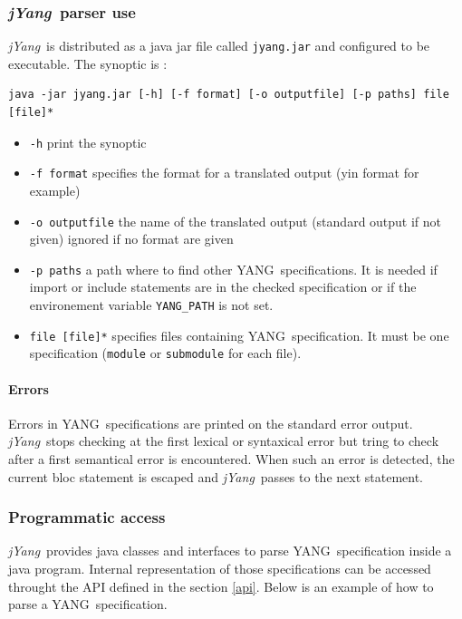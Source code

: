 \documentclass[a4paper]{article}
\newcommand{\jyang}{{\sl jYang}}
\newcommand{\y}{YANG}
\begin{document}
\subsubsection{\jyang\ parser use}

\jyang\ is distributed  as a java jar file  called {\tt jyang.jar} and
configured to be executable. The synoptic is :

\begin{verbatim}
java -jar jyang.jar [-h] [-f format] [-o outputfile] [-p paths] file [file]*
\end{verbatim}

\begin{itemize}
\item
{\tt -h} print the synoptic
\item
{\tt  -f format}  specifies the  format for  a translated  output (yin
format for example)
\item
{\tt -o outputfile} the name of the translated output (standard output
if not given) ignored if no format are given
\item
{\tt -p  paths} a path where  to find other \y\  specifications. It is
needed   if  import  or   include  statements   are  in   the  checked
specification or  if the environement variable {\tt  YANG\_PATH} is not
set.
\item
{\tt file  [file]*} specifies  files containing \y\  specification. It
must be  one specification ({\tt  module} or {\tt submodule}  for each
file).
\end{itemize}

\paragraph{Errors}

Errors in \y\ specifications are printed on the standard error output.
\jyang\ stops  checking at the  first lexical or syntaxical  error but
tring to  check after  a first semantical  error is  encountered. When
such an error  is detected, the current bloc  statement is escaped and
\jyang\ passes to the next statement.

\subsubsection{Programmatic access}

\jyang\   provides  java   classes   and  interfaces   to  parse   \y\
specification inside a java  program. Internal representation of those
specifications can be accessed throught the API defined in the section
\ref{api}. Below is an example of how to parse a \y\ specification.
\end{document}
